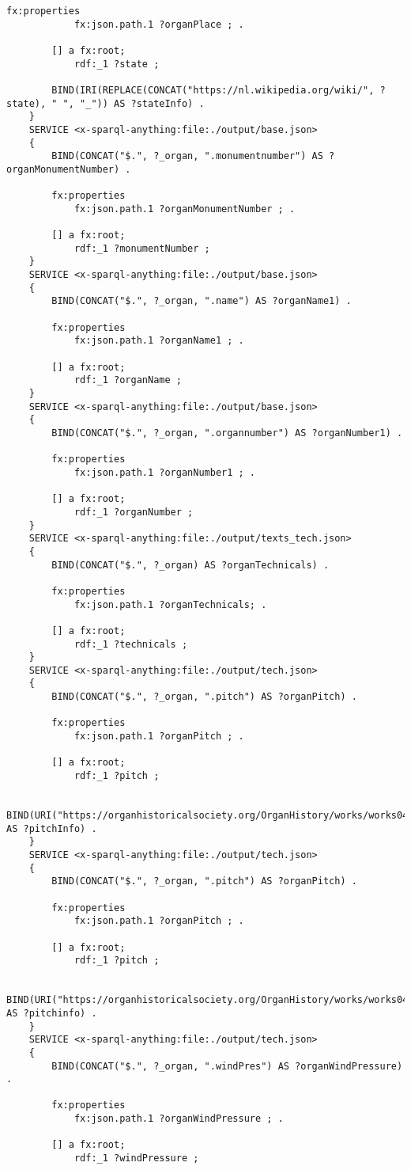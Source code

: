 \begin{lstlisting}[caption={organ-details.sparql}]
		fx:properties
			fx:json.path.1 ?organPlace ; .

		[] a fx:root; 
			rdf:_1 ?state ;

		BIND(IRI(REPLACE(CONCAT("https://nl.wikipedia.org/wiki/", ?state), " ", "_")) AS ?stateInfo) .
	} 
	SERVICE <x-sparql-anything:file:./output/base.json>
	{
		BIND(CONCAT("$.", ?_organ, ".monumentnumber") AS ?organMonumentNumber) .

		fx:properties
			fx:json.path.1 ?organMonumentNumber ; .

		[] a fx:root; 
			rdf:_1 ?monumentNumber ;
	} 
	SERVICE <x-sparql-anything:file:./output/base.json>
	{
		BIND(CONCAT("$.", ?_organ, ".name") AS ?organName1) .

		fx:properties
			fx:json.path.1 ?organName1 ; .

		[] a fx:root; 
			rdf:_1 ?organName ;
	} 
	SERVICE <x-sparql-anything:file:./output/base.json>
	{
		BIND(CONCAT("$.", ?_organ, ".organnumber") AS ?organNumber1) .

		fx:properties
			fx:json.path.1 ?organNumber1 ; .

		[] a fx:root; 
			rdf:_1 ?organNumber ;
	} 
	SERVICE <x-sparql-anything:file:./output/texts_tech.json> 
	{
		BIND(CONCAT("$.", ?_organ) AS ?organTechnicals) .

		fx:properties
			fx:json.path.1 ?organTechnicals; .

		[] a fx:root; 
			rdf:_1 ?technicals ; 
	} 
	SERVICE <x-sparql-anything:file:./output/tech.json>
	{
		BIND(CONCAT("$.", ?_organ, ".pitch") AS ?organPitch) .

		fx:properties
			fx:json.path.1 ?organPitch ; .

		[] a fx:root; 
			rdf:_1 ?pitch ;
		
		BIND(URI("https://organhistoricalsociety.org/OrganHistory/works/works04.htm") AS ?pitchInfo) .
	} 
	SERVICE <x-sparql-anything:file:./output/tech.json>
	{
		BIND(CONCAT("$.", ?_organ, ".pitch") AS ?organPitch) .

		fx:properties
			fx:json.path.1 ?organPitch ; .

		[] a fx:root; 
			rdf:_1 ?pitch ;
		
		BIND(URI("https://organhistoricalsociety.org/OrganHistory/works/works04.htm") AS ?pitchinfo) .
	} 
	SERVICE <x-sparql-anything:file:./output/tech.json>
	{
		BIND(CONCAT("$.", ?_organ, ".windPres") AS ?organWindPressure) .

		fx:properties
			fx:json.path.1 ?organWindPressure ; .

		[] a fx:root; 
			rdf:_1 ?windPressure ;


\end{lstlisting}
